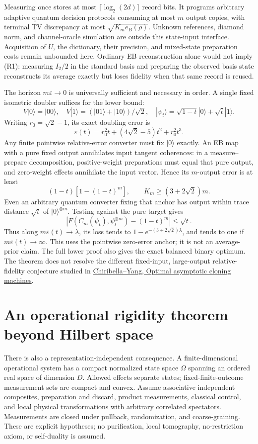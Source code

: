 \documentclass[11pt]{article}
\begin{document}
Measuring once stores at most $\lceil\log_2(2d)\rceil$ record bits. It programs arbitrary adaptive quantum decision protocols consuming at most $m$ output copies, with terminal TV discrepancy at most $\sqrt{K_m e_B(\rho)}$. Unknown references, diamond norm, and channel-oracle simulation are outside this state-input interface. Acquisition of $U$, the dictionary, their precision, and mixed-state preparation costs remain unbounded here. Ordinary EB reconstruction alone would not imply (R1): measuring $I_2/2$ in the standard basis and preparing the observed basis state reconstructs its average exactly but loses fidelity when that same record is reused.

The horizon $m\varepsilon\to0$ is universally sufficient and necessary in order. A single fixed isometric doubler suffices for the lower bound:
\[
V|0\rangle=|00\rangle,\quad V|1\rangle=(|01\rangle+|10\rangle)/\sqrt2,
\quad |\psi_t\rangle=\sqrt{1-t}|0\rangle+\sqrt t|1\rangle.
\]
Writing $r_0=\sqrt2-1$, its exact doubling error is
\[
\varepsilon(t)=r_0^2t+(4\sqrt2-5)t^2+r_0^2t^3.
\tag{R2}
\]
Any finite pointwise relative-error converter must fix $|0\rangle$ exactly. An EB map with a pure fixed output annihilates input tangent coherences: in a measure--prepare decomposition, positive-weight preparations must equal that pure output, and zero-weight effects annihilate the input vector. Hence its $m$-output error is at least
\[
(1-t)[1-(1-t)^m],\qquad K_m\ge(3+2\sqrt2)m.
\tag{R3}
\]
Even an arbitrary quantum converter fixing that anchor has output within trace distance $\sqrt t$ of $|0\rangle^{\otimes m}$. Testing against the pure target gives
\[
\left|F(C_m(\psi_t),\psi_t^{\otimes m})-(1-t)^m\right|\le\sqrt t.
\]
Thus along $m\varepsilon(t)\to\lambda$, its loss tends to $1-e^{-(3+2\sqrt2)\lambda}$, and tends to one if $m\varepsilon(t)\to\infty$. This uses the pointwise zero-error anchor; it is not an average-prior claim. The full lower proof also gives the exact balanced binary optimum. The theorem does not resolve the different fixed-input, large-output relative-fidelity conjecture studied in \href{https://arxiv.org/abs/1404.0990}{Chiribella--Yang, Optimal asymptotic cloning machines}.

\section{An operational rigidity theorem beyond Hilbert space}\label{sec:operational}

There is also a representation-independent consequence. A finite-dimensional operational system has a compact normalized state space $\Omega$ spanning an ordered real space of dimension $D$. Allowed effects separate states; fixed-finite-outcome measurement sets are compact and convex. Assume associative independent composites, preparation and discard, product measurements, classical control, and local physical transformations with arbitrary correlated spectators. Measurements are closed under pullback, randomization, and coarse-graining. These are explicit hypotheses; no purification, local tomography, no-restriction axiom, or self-duality is assumed.
\end{document}
